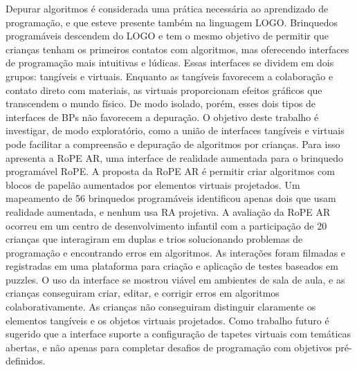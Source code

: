 \setlength{\absparsep}{14pt} 
\begin{resumo}

Depurar algoritmos é considerada uma prática necessária ao aprendizado de programação, e que esteve presente também na linguagem LOGO.  Brinquedos programáveis descendem do LOGO e tem o mesmo objetivo de permitir que crianças tenham os primeiros contatos com algoritmos, mas oferecendo interfaces de programação mais intuitivas e lúdicas. Essas interfaces se dividem em dois grupos: tangíveis e virtuais. Enquanto as tangíveis favorecem a colaboração e contato direto com materiais, as virtuais proporcionam efeitos gráficos que transcendem o mundo físico. De modo isolado, porém, esses dois tipos de interfaces de BPs não favorecem a depuração. O objetivo deste trabalho é investigar, de modo exploratório, como a união de interfaces tangíveis e virtuais pode facilitar a compreensão e depuração de algoritmos por crianças. Para isso apresenta a RoPE AR, uma interface de realidade aumentada para o brinquedo programável RoPE. A proposta da RoPE AR é permitir criar algoritmos com blocos de papelão aumentados por elementos virtuais projetados. Um mapeamento de 56 brinquedos programáveis identificou apenas dois que usam realidade aumentada, e nenhum usa RA projetiva.  A avaliação da RoPE AR ocorreu em um centro de desenvolvimento infantil com a participação de 20 crianças que interagiram em duplas e trios solucionando problemas de programação e encontrando erros em algoritmos. As interações foram filmadas e registradas em uma plataforma para criação e aplicação de testes baseados em puzzles. O uso da interface se mostrou viável em ambientes de sala de aula, e as crianças conseguiram criar, editar, e corrigir erros em algoritmos colaborativamente. As crianças não conseguiram distinguir claramente os elementos tangíveis e os objetos virtuais projetados. Como trabalho futuro é sugerido que a interface suporte a configuração de tapetes virtuais com temáticas abertas, e não apenas para completar desafios de programação com objetivos pré-definidos.




\end{resumo}
